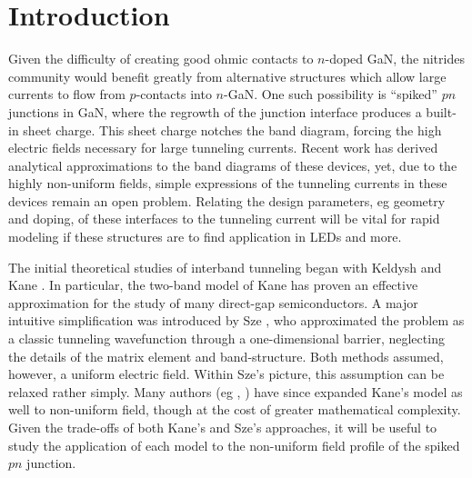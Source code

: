 \section{Introduction}
Given the difficulty of creating good ohmic contacts to $n$-doped GaN, the nitrides community would benefit greatly from alternative structures which allow large currents to flow from $p$-contacts into $n$-GaN.  One such possibility is ``spiked'' $pn$ junctions in GaN, where the regrowth of the junction interface produces a built-in sheet charge.  This sheet charge notches the band diagram, forcing the high electric fields necessary for large tunneling currents.  Recent work has derived analytical approximations to the band diagrams of these devices, yet, due to the highly non-uniform fields, simple expressions of the tunneling currents in these devices remain an open problem.  Relating the design parameters, eg geometry and doping, of these interfaces to the tunneling current will be vital for rapid modeling if these structures are to find application in LEDs and more.

The initial theoretical studies of interband tunneling began with Keldysh \cite{Keldysh_1958} and Kane \cite{Kane_1960}.  In particular, the two-band model of Kane has proven an effective approximation for the study of many direct-gap semiconductors.  A major intuitive simplification was introduced by Sze \cite{Sze_2nd}, who approximated the problem as a classic tunneling wavefunction through a one-dimensional barrier, neglecting the details of the matrix element and band-structure.  Both methods assumed, however, a uniform electric field. Within Sze's picture, this assumption can be relaxed rather simply.  Many authors (eg \cite{Takayanagi_1991}, \cite{Tanaka_1994}) have since expanded Kane's model as well to non-uniform field, though at the cost of greater mathematical complexity.  Given the trade-offs of both Kane's and Sze's approaches, it will be useful to study the application of each model to the non-uniform field profile of the spiked $pn$ junction.
